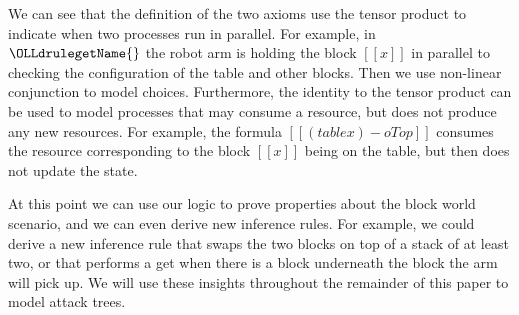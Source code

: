 We can see that the definition of the two axioms use the tensor
product to indicate when two processes run in parallel.  For example,
in $\OLLdrulegetName{}$ the robot arm is holding the block $[[x]]$ in
parallel to checking the configuration of the table and other blocks.
Then we use non-linear conjunction to model choices.  Furthermore, the
identity to the tensor product can be used to model processes that may
consume a resource, but does not produce any new resources.  For
example, the formula $[[(table x) -o Top]]$ consumes the resource
corresponding to the block $[[x]]$ being on the table, but then does
not update the state.

At this point we can use our logic to prove properties about the block
world scenario, and we can even derive new inference rules.  For
example, we could derive a new inference rule that swaps the two
blocks on top of a stack of at least two, or that performs a get when
there is a block underneath the block the arm will pick up.  We will
use these insights throughout the remainder of this paper to model
attack trees.
